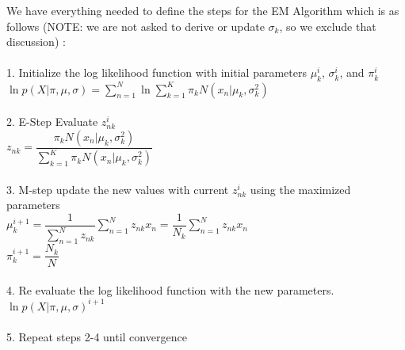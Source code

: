 \documentclass[12pt]{article}
\begin{document}
    We have everything needed to define the steps for the EM Algorithm which is as follows (NOTE: we are not asked to derive or update $\sigma_k$, so we exclude that discussion) : \\
    \\
    1. Initialize the log likelihood function with initial parameters $\mu_{k}^{i}$, $\sigma_{k}^{i}$, and $\pi_{k}^{i}$ \\
    $\ln p(X|\pi,\mu,\sigma) = \sum_{n=1}^N \ln   \sum_{k=1}^K \pi_k  N(x_n| \mu_k, \sigma_k^2) $ \\
    \\
    2. E-Step Evaluate $z_{nk}^i$ \\
    $z_{nk}=\dfrac{\pi_k  N(x_n| \mu_k, \sigma_k^2)}{\sum_{k=1}^K \pi_k  N(x_n| \mu_k, \sigma_k^2)} $ \\
    \\
    3. M-step update the new values with current $z_{nk}^i$ using the maximized parameters\\
     $\mu_{k}^{i+1} = \dfrac{1}{\sum_{n=1}^N z_{nk}} \sum_{n=1}^N z_{nk} x_n = \dfrac{1}{N_k} \sum_{n=1}^N z_{nk} x_n$ \\
    $ \pi_{k}^{i+1} = \dfrac{N_k}{N}$\\
    \\
    4. Re evaluate the log likelihood function with the new parameters. \\
    $\ln p(X|\pi,\mu,\sigma)^{i+1}$ \\
    \\
    5. Repeat steps 2-4 until convergence
\end{document}
